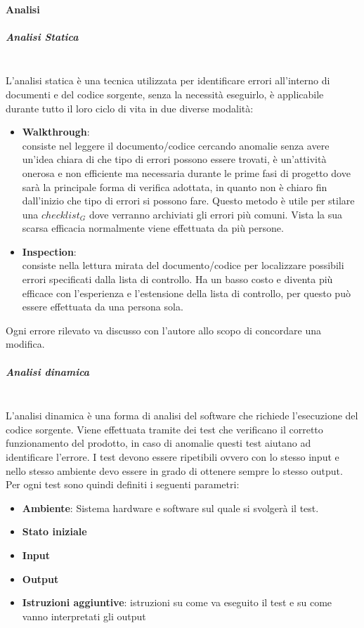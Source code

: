		\paragraph{Analisi}
			\subparagraph{Analisi Statica} \mbox{} \\
			L'analisi statica è una tecnica utilizzata per identificare errori all'interno di documenti e del codice sorgente, senza la necessità eseguirlo, è applicabile durante tutto il loro ciclo di vita in due diverse modalità:
			\begin{itemize}
				\item \textbf{Walkthrough}: \mbox{} \\
				consiste nel leggere il documento/codice cercando anomalie senza avere un'idea chiara di che tipo di errori possono essere trovati, è un'attività onerosa e non efficiente ma necessaria durante le prime fasi di progetto dove sarà la principale forma di verifica adottata, in quanto non è chiaro fin dall'inizio che tipo di errori si possono fare.
				Questo metodo è utile per stilare una $checklist_G$ dove verranno archiviati gli errori più comuni.
				Vista la sua scarsa efficacia normalmente viene effettuata da più persone.
				\item \textbf{Inspection}: \mbox{} \\
				consiste nella lettura mirata del documento/codice per localizzare possibili errori specificati dalla lista di controllo. Ha un basso costo e diventa più efficace con l'esperienza e l'estensione della lista di controllo, per questo può essere effettuata da una persona sola.
			\end{itemize}
		    Ogni errore rilevato va discusso con l'autore allo scopo di concordare una modifica.
			\subparagraph{Analisi dinamica} \mbox{} \\
			L'analisi dinamica è una forma di analisi del software che richiede l'esecuzione del codice sorgente. Viene effettuata tramite dei test che verificano il corretto funzionamento del prodotto, in caso di anomalie questi test aiutano ad identificare l'errore.
			I test devono essere ripetibili ovvero con lo stesso input e nello stesso ambiente devo essere in grado di ottenere sempre lo stesso output. Per ogni test sono quindi definiti i seguenti parametri:
			\begin{itemize}
				\item \textbf{Ambiente}: Sistema hardware e software sul quale si svolgerà il test.
				\item \textbf{Stato iniziale}
				\item \textbf{Input}
				\item \textbf{Output}
				\item \textbf{Istruzioni aggiuntive}: istruzioni su come va eseguito il test e su come vanno interpretati gli output
			\end{itemize}
